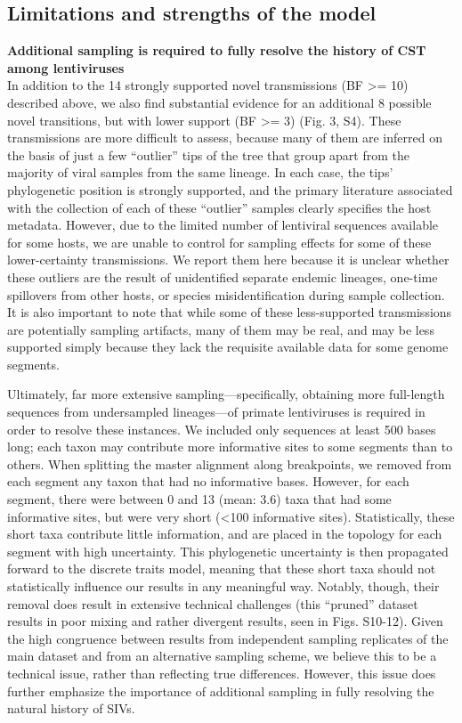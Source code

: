 \subsection*{Limitations and strengths of the model}
\textbf{Additional sampling is required to fully resolve the history of CST among lentiviruses}\\
In addition to the 14 strongly supported novel transmissions (BF >= 10) described above, we also find substantial evidence for an additional 8 possible novel transitions, but with lower support (BF >= 3) (Fig. 3, S4).
These transmissions are more difficult to assess, because many of them are inferred on the basis of just a few “outlier” tips of the tree that group apart from the majority of viral samples from the same lineage.
In each case, the tips’ phylogenetic position is strongly supported, and the primary literature associated with the collection of each of these “outlier” samples clearly specifies the host metadata.
However, due to the limited number of lentiviral sequences available for some hosts, we are unable to control for sampling effects for some of these lower-certainty transmissions.
We report them here because it is unclear whether these outliers are the result of unidentified separate endemic lineages, one-time spillovers from other hosts, or species misidentification during sample collection.
It is also important to note that while some of these less-supported transmissions are potentially sampling artifacts, many of them may be real, and may be less supported simply because they lack the requisite available data for some genome segments.

Ultimately, far more extensive sampling—specifically, obtaining more full-length sequences from undersampled lineages—of primate lentiviruses is required in order to resolve these instances.
We included only sequences at least 500 bases long; each taxon may contribute more informative sites to some segments than to others.
When splitting the master alignment along breakpoints, we removed from each segment any taxon that had no informative bases.
However, for each segment, there were between 0 and 13 (mean: 3.6) taxa that had some informative sites, but were very short (<100 informative sites).
Statistically, these short taxa contribute little information, and are placed in the topology for each segment with high uncertainty.
This phylogenetic uncertainty is then propagated forward to the discrete traits model, meaning that these short taxa should not statistically influence our results in any meaningful way.
Notably, though, their removal does result in extensive technical challenges (this “pruned” dataset results in poor mixing and rather divergent results, seen in Figs. S10-12).
Given the high congruence between results from independent sampling replicates of the main dataset and from an alternative sampling scheme, we believe this to be a technical issue, rather than reflecting true differences.
However, this issue does further emphasize the importance of additional sampling in fully resolving the natural history of SIVs.

